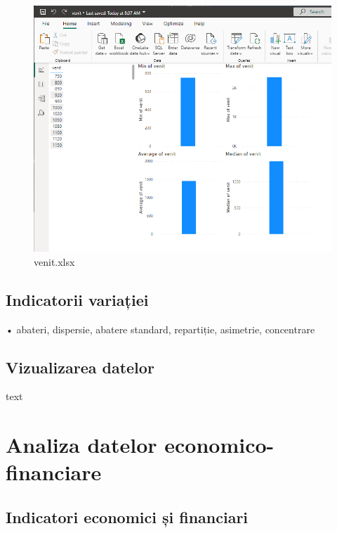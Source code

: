 \documentclass[
  11pt,
  b5paper,
  nottoc]{book}
\begin{document}
\begin{figure}[H]

{\centering \includegraphics{date/medie_simpla_Pbi.png}

}

\caption{venit.xlsx}

\end{figure}%

\section{Indicatorii variației}\label{indicatorii-variaux21biei}

• abateri, dispersie, abatere standard, repartiție, asimetrie,
concentrare

\section{Vizualizarea datelor}\label{vizualizarea-datelor}

text


\chapter{Analiza datelor economico-financiare}\label{cap4}

\section{Indicatori economici și
financiari}\label{indicatori-economici-ux219i-financiari}
\end{document}
